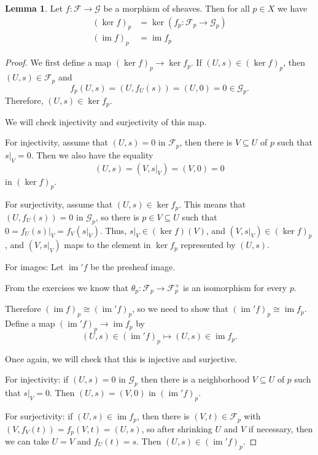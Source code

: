 \documentclass[a4paper]{amsbook}
\theoremstyle{definition}
\newtheorem{lemma}[definition]{Lemma}
\DeclareMathOperator\im{im}
\begin{document}
\begin{lemma}
\label{KernelsCokernelsStalks}
Let $f\colon \mathcal{F}\to \mathcal{G}$ be a morphism of sheaves. Then
for all $p \in X$ we have
\begin{align*}
	(\ker f)_p &= \ker(f_p\colon \mathcal{F}_p\to \mathcal{G}_p)\\
	(\im f)_p &= \im f_p
\end{align*}
\end{lemma}
\begin{proof}[Proof]
We first define a map $(\ker f)_p \to \ker f_p$. If $(U, s) \in (\ker f)_p$, then
$(U, s) \in \mathcal{F}_p$ and
\[ f_p(U, s) = (U, f_U(s)) = (U, 0) = 0 \in \mathcal{G}_p. \]
Therefore, $(U, s) \in \ker f_p$.

We will check injectivity and surjectivity of this map.

For injectivity, assume that $(U, s) = 0$ in $\mathcal{F}_p$, then there is
$V \subseteq U$ of $p$ such that $s|_V = 0$. Then we also have the equality
\[ (U, s) = (V, s|_V) = (V, 0) = 0 \]
in  $(\ker f)_p$.

For surjectivity, assume that $(U, s) \in \ker f_p$. This means that
 $(U, f_U(s)) = 0$ in $\mathcal{G}_p$, so there is $p \in V \subseteq U$ such
 that $0 = f_U(s)|_V = f_V(s|_V)$. Thus, $s|_V \in (\ker f)(V)$, and
 $(V, s|_V) \in (\ker f)_p$, and $(V, s|_V)$ maps to the element in $\ker f_p$
 represented by $(U, s)$.

For images: Let $\im' f$ be the presheaf image.

From the exercises we know that $\theta_p\colon \mathcal{F}_p \to \mathcal{F}^+_p$ is
an isomorphism for every $p$.

Therefore $(\im f)_p \cong (\im' f)_p$, so we need to show that
$(\im' f)_p \cong \im f_p$. Define a map
$(\im' f)_p \to \im f_p$ by
\[ (U, s)  \in (\im' f)_p \mapsto (U, s) \in \im f_p. \]

Once again, we will check that this is injective and surjective.

For injectivity: if $(U, s) = 0$ in $\mathcal{G}_p$ then there is a neighborhood
$V \subseteq U$ of $p$ such that $s|_V = 0$. Then $(U, s) = (V, 0)$ in $(\im' f)_p$.

For surjectivity: if $(U, s) \in \im f_p$, then there is
$(V, t) \in \mathcal{F}_p$ with $(V, f_V(t)) = f_p(V, t) = (U, s)$, so after
shrinking $U$ and $V$ if necessary, then we can take $U = V$ and
$f_U(t) = s$. Then $(U, s) \in (\im' f)_p$.
\end{proof}
\end{document}
